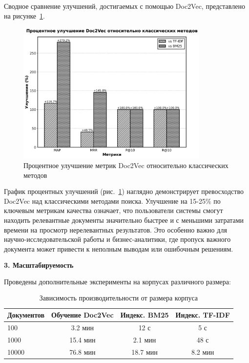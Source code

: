Сводное сравнение улучшений, достигаемых с помощью Doc2Vec, представлено на рисунке~\ref{fig:improvement_comparison}.

\begin{figure}[H]
	\centering
	\includegraphics[width=0.85\textwidth]{images/diploma_bw_plots/improvement_comparison_bw.png}
	\caption{Процентное улучшение метрик Doc2Vec относительно классических методов}
	\label{fig:improvement_comparison}
\end{figure}

График процентных улучшений (рис.~\ref{fig:improvement_comparison}) наглядно демонстрирует превосходство Doc2Vec над классическими методами поиска. Улучшение на 15-25\% по ключевым метрикам качества означает, что пользователи системы смогут находить релевантные документы значительно быстрее и с меньшими затратами времени на просмотр нерелевантных результатов. Это особенно важно для научно-исследовательской работы и бизнес-аналитики, где пропуск важного документа может привести к неполным выводам или ошибочным решениям.

\textbf{3. Масштабируемость}

Проведены дополнительные эксперименты на корпусах различного размера:

\begin{table}[H]
	\caption{Зависимость производительности от размера корпуса}
	\begin{center}
		\begin{tabular}{|l|c|c|c|}
			\hline
			\textbf{Документов} & \textbf{Обучение Doc2Vec} & \textbf{Индекс. BM25} & \textbf{Индекс. TF-IDF} \\
			\hline
			100 & 3.2 мин & 12 с & 5 с \\
			\hline
			1000 & 15.4 мин & 2.1 мин & 48 с \\
			\hline
			10000 & 76.8 мин & 18.7 мин & 8.2 мин \\
			\hline
		\end{tabular}
	\end{center}
\end{table}

